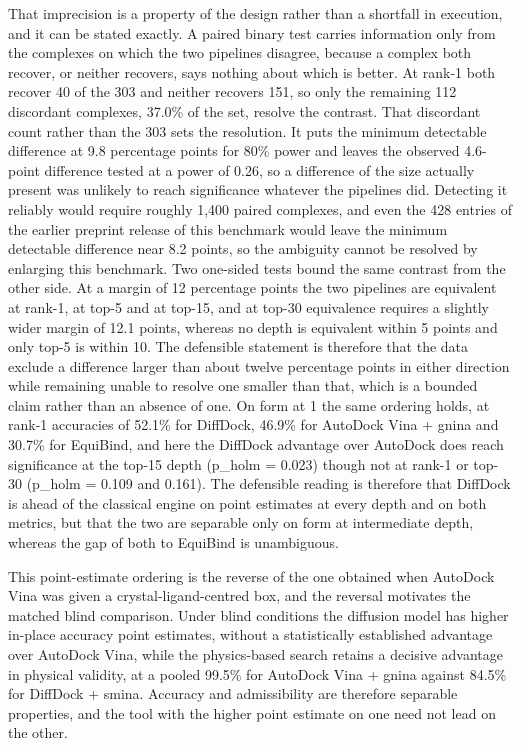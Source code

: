 That imprecision is a property of the design rather than a shortfall in execution, and it can be stated exactly. A paired binary test carries information only from the complexes on which the two pipelines disagree, because a complex both recover, or neither recovers, says nothing about which is better. At rank-1 both recover 40 of the 303 and neither recovers 151, so only the remaining 112 discordant complexes, 37.0\% of the set, resolve the contrast. That discordant count rather than the 303 sets the resolution. It puts the minimum detectable difference at 9.8 percentage points for 80\% power and leaves the observed 4.6-point difference tested at a power of 0.26, so a difference of the size actually present was unlikely to reach significance whatever the pipelines did. Detecting it reliably would require roughly 1,400 paired complexes, and even the 428 entries of the earlier preprint release of this benchmark would leave the minimum detectable difference near 8.2 points, so the ambiguity cannot be resolved by enlarging this benchmark. Two one-sided tests bound the same contrast from the other side. At a margin of 12 percentage points the two pipelines are equivalent at rank-1, at top-5 and at top-15, and at top-30 equivalence requires a slightly wider margin of 12.1 points, whereas no depth is equivalent within 5 points and only top-5 is within 10. The defensible statement is therefore that the data exclude a difference larger than about twelve percentage points in either direction while remaining unable to resolve one smaller than that, which is a bounded claim rather than an absence of one. On form at 1\angstrom{} the same ordering holds, at rank-1 accuracies of 52.1\% for DiffDock, 46.9\% for AutoDock Vina + gnina and 30.7\% for EquiBind, and here the DiffDock advantage over AutoDock does reach significance at the top-15 depth (p\_holm = 0.023) though not at rank-1 or top-30 (p\_holm = 0.109 and 0.161). The defensible reading is therefore that DiffDock is ahead of the classical engine on point estimates at every depth and on both metrics, but that the two are separable only on form at intermediate depth, whereas the gap of both to EquiBind is unambiguous.

This point-estimate ordering is the reverse of the one obtained when AutoDock Vina was given a crystal-ligand-centred box, and the reversal motivates the matched blind comparison. Under blind conditions the diffusion model has higher in-place accuracy point estimates, without a statistically established advantage over AutoDock Vina, while the physics-based search retains a decisive advantage in physical validity, at a pooled 99.5\% for AutoDock Vina + gnina against 84.5\% for DiffDock + smina. Accuracy and admissibility are therefore separable properties, and the tool with the higher point estimate on one need not lead on the other.

